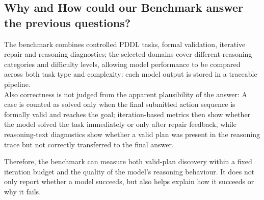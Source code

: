 \subsection{Why and How could our Benchmark answer the previous questions?}
The benchmark combines controlled PDDL tasks, formal validation, iterative repair and reasoning diagnostics; the selected domains cover different reasoning categories and difficulty levels, allowing model performance to be compared across both task type and complexity: each model output is stored in a traceable pipeline.\\
Also correctness is not judged from the apparent plausibility of the answer: A case is counted as solved only when the final submitted action sequence is formally valid and reaches the goal; iteration-based metrics then show whether the model solved the task immediately or only after repair feedback, while reasoning-text diagnostics show whether a valid plan was present in the reasoning trace but not correctly transferred to the final answer.

Therefore, the benchmark can measure both valid-plan discovery within a fixed iteration budget and the quality of the model's reasoning behaviour. It does not only report whether a model succeeds, but also helps explain how it succeeds or why it fails.









